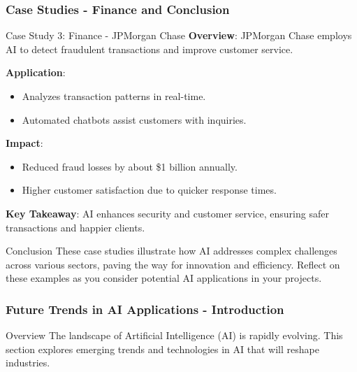 \documentclass[aspectratio=169]{beamer}
\begin{document}
\begin{frame}[fragile]
    \frametitle{Case Studies - Finance and Conclusion}
    \begin{block}{Case Study 3: Finance - JPMorgan Chase}
        \textbf{Overview}: 
        JPMorgan Chase employs AI to detect fraudulent transactions and improve customer service.
        
        \textbf{Application}:
        \begin{itemize}
            \item Analyzes transaction patterns in real-time.
            \item Automated chatbots assist customers with inquiries.
        \end{itemize}
        
        \textbf{Impact}:
        \begin{itemize}
            \item Reduced fraud losses by about \$1 billion annually.
            \item Higher customer satisfaction due to quicker response times.
        \end{itemize}
        
        \textbf{Key Takeaway}: 
        AI enhances security and customer service, ensuring safer transactions and happier clients.
    \end{block}

    \begin{block}{Conclusion}
        These case studies illustrate how AI addresses complex challenges across various sectors, paving the way for innovation and efficiency. Reflect on these examples as you consider potential AI applications in your projects.
    \end{block}
\end{frame}

\begin{frame}[fragile]
    \frametitle{Future Trends in AI Applications - Introduction}
    \begin{block}{Overview}
        The landscape of Artificial Intelligence (AI) is rapidly evolving. This section explores emerging trends and technologies in AI that will reshape industries.
    \end{block}
\end{frame}
\end{document}
